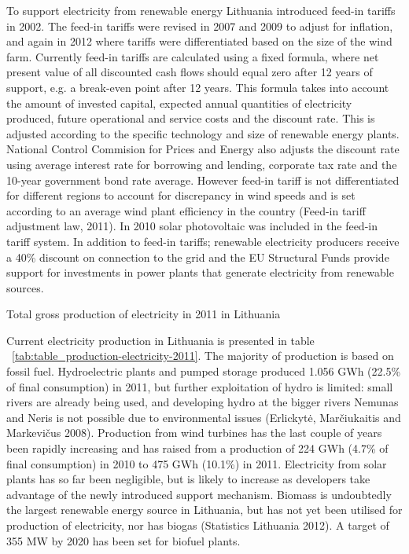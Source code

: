 \documentclass[a4paper, 12pt]{article}
\begin{document}
To support electricity from renewable energy Lithuania introduced feed-in tariffs in 2002. The feed-in tariffs were revised in 2007 and 2009 to adjust for inflation, and again in 2012 where tariffs were differentiated based on the size of the wind farm. Currently feed-in tariffs are calculated using a fixed formula, where net present value of all discounted cash flows should equal zero after 12 years of support, e.g. a break-even point after 12 years. This formula takes into account the amount of invested capital, expected annual quantities of electricity produced, future operational and service costs and the discount rate. This is adjusted according to the specific technology and size of renewable energy plants. National Control Commision for Prices and Energy also adjusts the discount rate using average interest rate for borrowing and lending, corporate tax rate and the 10-year government bond rate average. However feed-in tariff is not differentiated for different regions to account for discrepancy in wind speeds and is set according to an average wind plant efficiency in the country (Feed-in tariff adjustment law, 2011). In 2010 solar photovoltaic was included in the feed-in tariff system. In addition to feed-in tariffs; renewable electricity producers receive a 40\% discount on connection to the grid and the EU Structural Funds provide support for investments in power plants that generate electricity from renewable sources.

\begin{table}
	\caption{Total gross production of electricity in 2011 in Lithuania}
	\label{tab:table_production-electricity-2011}
\end{table}


Current electricity production in Lithuania is presented in table ~\ref{tab:table_production-electricity-2011}. The majority of production is based on fossil fuel. Hydroelectric plants and pumped storage produced 1.056 GWh (22.5\% of final consumption) in 2011, but further exploitation of hydro is limited: small rivers are already being used, and developing hydro at the bigger rivers Nemunas and Neris is not possible due to environmental issues (Erlickytė, Marčiukaitis and Markevičus 2008). Production from wind turbines has the last couple of years been rapidly increasing and has raised from a production of 224 GWh (4.7\% of final consumption) in 2010 to 475 GWh (10.1\%) in 2011. Electricity from solar plants has so far been negligible, but is likely to increase as developers take advantage of the newly introduced support mechanism. Biomass is undoubtedly the largest renewable energy source in Lithuania, but has not yet been utilised for production of electricity, nor has biogas (Statistics Lithuania 2012). A target of 355 MW by 2020 has been set for biofuel plants. 
\end{document}
